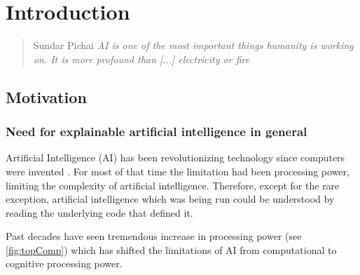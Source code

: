 
\chapter{Introduction}
\label{ch:Introduction}


\begin{quote}{Sundar Pichai}
\textit{AI is one of the most important things humanity is working on. It is more profound than [...] electricity or fire \cite{AIQuotePichai}}
\end{quote}

\section{Motivation}

\subsection{Need for explainable artificial intelligence in general}

Artificial Intelligence (AI) has been revolutionizing technology since computers were invented \cite{TimeLineOfAI}. For most of that time the limitation had been processing power, limiting the complexity of artificial intelligence. Therefore, except for the rare exception, artificial intelligence which was being run could be understood by reading the underlying code that defined it.


Past decades have seen tremendous increase in processing power (see \autoref{fig:topComp}) which has shifted the limitations of AI from computational to cognitive processing power.

